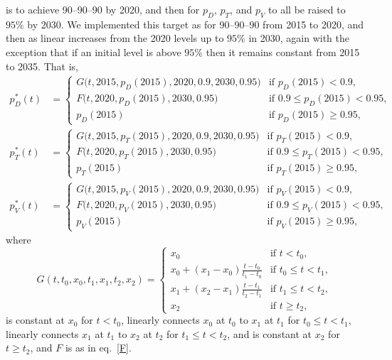 \documentclass{article}
\begin{document}
\begin{description}[labelsep=0.6ex]
\item[UNAIDS 95--95--95] is to achieve 90--90--90 by 2020, and then
  for $p_D$, $p_T$, and $p_V$ to all be raised to $95\%$ by 2030.  We
  implemented this target as for 90--90--90 from 2015 to 2020, and
  then as linear increases from the 2020 levels up to $95\%$ in 2030,
  again with the exception that if an initial level is above $95\%$
  then it remains constant from 2015 to 2035.  That is,
  \begin{equation}
    \label{unaids95_targets}
    \begin{split}
      p_D^*(t) &=
      \begin{cases}
        G\big(t, 2015, p_D(2015), 2020, 0.9, 2030, 0.95\big)
        & \text{if $p_D(2015) < 0.9$},
        \\
        F\big(t, 2020, p_D(2015), 2030, 0.95\big)
        & \text{if $0.9 \leq p_D(2015) < 0.95$},
        \\
        p_D(2015) & \text{if $p_D(2015) \geq 0.95$},
      \end{cases}
      \\
      p_T^*(t) &=
      \begin{cases}
        G\big(t, 2015, p_T(2015), 2020, 0.9, 2030, 0.95\big)
        & \text{if $p_T(2015) < 0.9$},
        \\
        F\big(t, 2020, p_T(2015), 2030, 0.95\big)
        & \text{if $0.9 \leq p_T(2015) < 0.95$},
        \\
        p_T(2015) & \text{if $p_T(2015) \geq 0.95$},
      \end{cases}
      \\
      p_V^*(t) &=
      \begin{cases}
        G\big(t, 2015, p_V(2015), 2020, 0.9, 2030, 0.95\big)
        & \text{if $p_V(2015) < 0.9$},
        \\
        F\big(t, 2020, p_V(2015), 2030, 0.95\big)
        & \text{if $0.9 \leq p_V(2015) < 0.95$},
        \\
        p_V(2015) & \text{if $p_V(2015) \geq 0.95$},
      \end{cases}
    \end{split}
  \end{equation}
  where
  \begin{equation}
    G(t, t_0, x_0, t_1, x_1, t_2, x_2) =
    \begin{cases}
      x_0 & \text{if $t < t_0$},
      \\
      x_0 + (x_1 - x_0) \frac{t - t_0}{t_1 - t_0} &
      \text{if $t_0 \leq t < t_1$},
      \\
      x_1 + (x_2 - x_1) \frac{t - t_1}{t_2 - t_1} &
      \text{if $t_1 \leq t < t_2$},
      \\
      x_2 & \text{if $t \geq t_2$},
    \end{cases}
  \end{equation}
  is constant at $x_0$ for $t < t_0$, linearly connects $x_0$ at $t_0$
  to $x_1$ at $t_1$ for $t_0 \leq t < t_1$, linearly connects $x_1$ at
  $t_1$ to $x_2$ at $t_2$ for $t_1 \leq t < t_2$, and is constant at
  $x_2$ for $t \geq t_2$, and $F$ is as in eq.~\eqref{F}.

\end{description}
\end{document}
